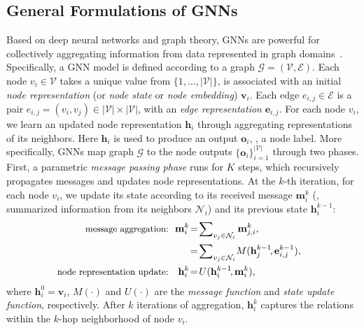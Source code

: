 \documentclass[10pt,twocolumn,letterpaper]{article}
\begin{document}
\subsection{General Formulations of GNNs}\label{sec:forgnn}
	\vspace*{-3pt}	
Based on deep neural networks and graph theory,  GNNs are powerful for collectively aggregating information from data represented in graph domains~\cite{scarselli2009graph,gilmer2017neural}. Specifically, a GNN model is defined according to a graph $\mathcal{G}\!=\!(\mathcal{V},\mathcal{E})$. Each node $v_i\!\in\!\mathcal{V}$ takes a unique value from $\{1,\dots,|\mathcal{V}|\}$, is associated with an initial \textit{node representation}
(or \textit{node state} or \textit{node embedding}) $\mathbf{v}_i$. Each edge $e_{i,j}\!\in\!\mathcal{E}$ is a pair $e_{i,j}\!=\!(v_i,v_j)\!\in\!|\mathcal{V}|\!\times\!|\mathcal{V}|$, with an \textit{edge representation} $\mathbf{e}_{i,j}$. For each node $v_i$, we learn an updated node representation $\mathbf{h}_i$ through aggregating representations
of its neighbors. Here $\mathbf{h}_i$ is used to produce an output $\mathbf{o}_i$, \ie, a node label.
More specifically, GNNs map graph $\mathcal{G}$ to the node outputs $\{\mathbf{o}_i\}_{i=1}^{|\mathcal{V}|}$ through two phases. First, a parametric \textit{message passing phase} runs for $K$ steps, which recursively propagates messages and updates node representations. At the $k$-th iteration, for each node $v_i$, we update its state according to its received message $\mathbf{m}^k_i$ (\ie, summarized information from its neighbors $\mathcal{N}_i$) and its previous state $\mathbf{h}^{k-1}_i$:
	\vspace*{-4pt}	
\begin{equation}
\begin{aligned}
    \!\!\!\!\!\!\text{\small{message aggregation:}}~~\mathbf{m}^k_i &\!=\!\sum\nolimits_{v_j\in \mathcal{N}_i}\mathbf{m}^k_{j,i},\\
    &\!=\!\sum\nolimits_{v_j\in \mathcal{N}_i}\!{M}(\mathbf{h}^{k-1}_j\!, \mathbf{e}^{k-1}_{i,j}),\!\!\\
    \!\!\!\!\!\!\text{\small{node representation update:}}~~~\mathbf{h}_i^k &\!=\! U(\mathbf{h}_i^{k-1}\!, \mathbf{m}_i^k),\!\!
    \end{aligned}
	\label{intro1}
	\vspace*{-4pt}	
\end{equation}
where $\mathbf{h}_i^0\!=\!\mathbf{v}_i$, $M(\cdot)$ and $U(\cdot)$ are the \textit{message function} and \textit{state update function}, respectively.
After $k$ iterations of aggregation, $\mathbf{h}^k_i$ captures the relations within the $k$-hop neighborhood of node $v_i$.
\end{document}
